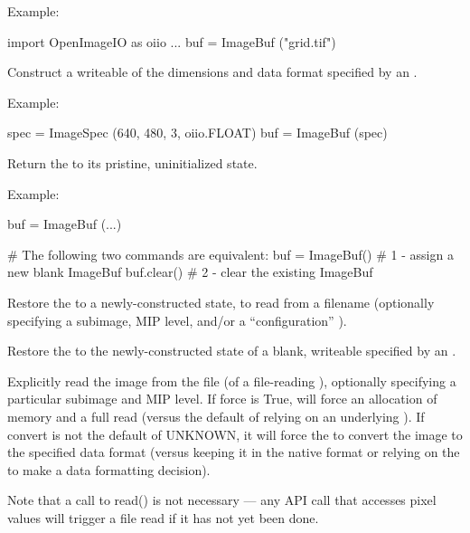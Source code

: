 \noindent Example:
\begin{code}
    import OpenImageIO as oiio
    ...
    buf = ImageBuf ("grid.tif")
\end{code}
\apiend


Construct a writeable \ImageBuf of the dimensions and data format specified
by an \ImageSpec.

\noindent Example:
\begin{code}
    spec = ImageSpec (640, 480, 3, oiio.FLOAT)
    buf = ImageBuf (spec)
\end{code}
\apiend

Return the \ImageBuf to its pristine, uninitialized state.

\noindent Example:
\begin{code}
    buf = ImageBuf (...)

    # The following two commands are equivalent:
    buf = ImageBuf()     # 1 - assign a new blank ImageBuf
    buf.clear()          # 2 - clear the existing ImageBuf
\end{code}
\apiend

Restore the \ImageBuf to a newly-constructed state, to read from
a filename (optionally specifying a subimage, MIP level, and/or 
a ``configuration'' \ImageSpec).
\apiend

Restore the \ImageBuf to the newly-constructed state of a blank, writeable
\ImageBuf specified by an \ImageSpec.
\apiend

Explicitly read the image from the file (of a file-reading \ImageBuf), optionally
specifying a particular subimage and MIP level.  If {\cf force} is {\cf True},
will force an allocation of memory and a full read (versus the default of
relying on an underlying \ImageCache).  If {\cf convert} is not
the default of {\cf UNKNOWN}, it will force the \ImageBuf to convert the
image to the specified data format (versus keeping it in the native 
format or relying on the \ImageCache to make a data formatting decision).

Note that a call to {\cf read()} is not necessary --- any \ImageBuf API call
that accesses pixel values will trigger a file read if it has not yet been
done.

